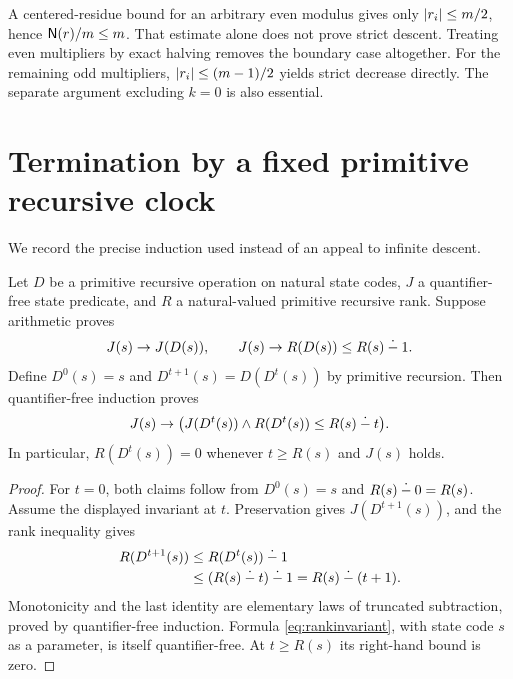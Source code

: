 \begin{remark}
A centered-residue bound for an arbitrary even modulus gives only
$\lvert r_i\rvert\le m/2$, hence $\mathsf N(r)/m\le m$. That estimate alone does
not prove strict descent. Treating even multipliers by exact halving removes
the boundary case altogether. For the remaining odd multipliers,
$\lvert r_i\rvert\le(m-1)/2$ yields strict decrease directly. The separate
argument excluding $k=0$ is also essential.
\end{remark}

\section{Termination by a fixed primitive recursive clock}
\label{sec:clock}

We record the precise induction used instead of an appeal to infinite
descent.

\begin{lemma}
\label{lem:clock}
Let $D$ be a primitive recursive operation on natural state codes, $J$ a
quantifier-free state predicate, and $R$ a natural-valued primitive
recursive rank. Suppose arithmetic proves
\[
 J(s)\to J(D(s)),\qquad
 J(s)\to R(D(s))\le R(s)\mathbin{\dot{-}}1.
\]
Define $D^0(s)=s$ and $D^{t+1}(s)=D(D^t(s))$ by primitive recursion.
Then quantifier-free induction proves
\begin{equation}
\label{eq:rankinvariant}
 J(s)\to
 \bigl(J(D^t(s))\land R(D^t(s))\le R(s)\mathbin{\dot{-}} t\bigr).
\end{equation}
In particular, $R(D^t(s))=0$ whenever $t\ge R(s)$ and $J(s)$ holds.
\end{lemma}

\begin{proof}
For $t=0$, both claims follow from $D^0(s)=s$ and $R(s)\mathbin{\dot{-}}0=R(s)$.
Assume the displayed invariant at $t$. Preservation gives $J(D^{t+1}(s))$,
and the rank inequality gives
\[
 \begin{split}
 R(D^{t+1}(s))
 &\le R(D^t(s))\mathbin{\dot{-}}1\\
 &\le(R(s)\mathbin{\dot{-}} t)\mathbin{\dot{-}}1
   =R(s)\mathbin{\dot{-}}(t+1).
 \end{split}
\]
Monotonicity and the last identity are elementary laws of truncated
subtraction, proved by quantifier-free induction. Formula
\eqref{eq:rankinvariant}, with state code $s$ as a parameter, is itself
quantifier-free. At $t\ge R(s)$ its right-hand bound is zero.
\end{proof}

